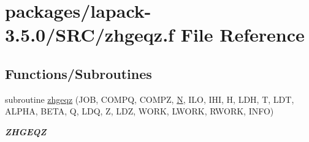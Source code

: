 \hypertarget{zhgeqz_8f}{}\section{packages/lapack-\/3.5.0/\+S\+R\+C/zhgeqz.f File Reference}
\label{zhgeqz_8f}
\subsection*{Functions/\+Subroutines}
\begin{DoxyCompactItemize}
\item 
subroutine \hyperlink{group__complex16GEcomputational_ga56eeaaec72c76c53df90a3aed330f17a}{zhgeqz} (J\+O\+B, C\+O\+M\+P\+Q, C\+O\+M\+P\+Z, \hyperlink{polmisc_8c_a0240ac851181b84ac374872dc5434ee4}{N}, I\+L\+O, I\+H\+I, H, L\+D\+H, T, L\+D\+T, A\+L\+P\+H\+A, B\+E\+T\+A, Q, L\+D\+Q, Z, L\+D\+Z, W\+O\+R\+K, L\+W\+O\+R\+K, R\+W\+O\+R\+K, I\+N\+F\+O)
\begin{DoxyCompactList}\small\item\em {\bfseries Z\+H\+G\+E\+Q\+Z} \end{DoxyCompactList}\end{DoxyCompactItemize}

